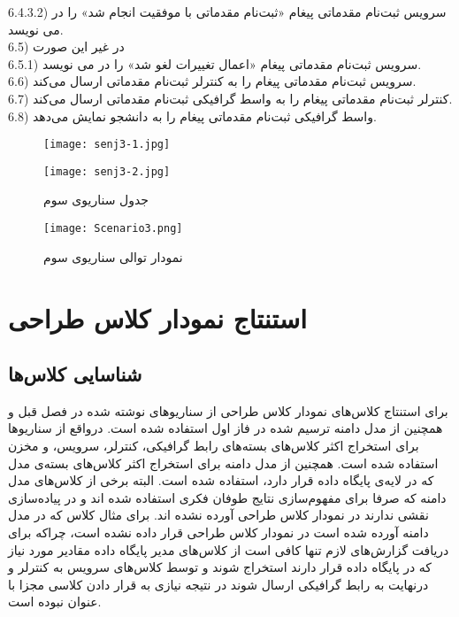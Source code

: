 \documentclass{report}
\begin{document}
6.4.3.2) سرویس ثبت‌نام مقدماتی پیغام «ثبت‌نام مقدماتی با موفقیت انجام شد» را در 
 می نویسد.\\
6.5) در غیر این صورت\\
6.5.1) سرویس ثبت‌نام مقدماتی پیغام «اعمال تغییرات لغو شد» را  در 
 می نویسد.\\
6.6) سرویس ثبت‌نام مقدماتی پیغام 
 را به کنترلر ثبت‌نام مقدماتی ارسال می‌کند.\\
6.7) کنترلر ثبت‌نام مقدماتی پیغام 
 را به واسط گرافیکی ثبت‌نام مقدماتی ارسال می‌کند.\\
6.8) واسط گرافیکی ثبت‌نام مقدماتی پیغام 
 را به دانشجو نمایش می‌دهد.\\
\clearpage
\begin{figure}[!h]
\texttt{[image: senj3-1.jpg]}
\end{figure} 
\begin{figure}[!h]
\texttt{[image: senj3-2.jpg]}
\caption{جدول سناریوی سوم} 
\end{figure}
\clearpage
{}
\begin{figure}[!h]
\centering
\texttt{[image: Scenario3.png]}
\caption{نمودار توالی سناریوی سوم}
\end{figure}
\clearpage

\chapter{استنتاج نمودار کلاس طراحی}

\section{شناسایی کلاس‌ها}
برای استنتاج کلاس‌های نمودار کلاس طراحی از سناریوهای نوشته شده در فصل قبل و همچنین از مدل دامنه ترسیم شده در فاز اول استفاده شده است. درواقع از سناریوها برای استخراج اکثر کلاس‌های بسته‌های رابط گرافیکی، کنترلر، سرویس، و مخزن استفاده شده است. همچنین از مدل دامنه برای استخراج اکثر کلاس‌های بسته‌ی مدل که در لایه‌ی پایگاه داده قرار دارد، استفاده شده است. البته برخی از کلاس‌های مدل دامنه که صرفا برای مفهوم‌سازی نتایج طوفان فکری استفاده شده اند و در پیاده‌سازی نقشی ندارند در نمودار کلاس طراحی آورده نشده اند. برای مثال کلاس
که در مدل دامنه آورده شده است در نمودار کلاس طراحی قرار داده نشده است، چراکه برای دریافت گزارش‌های لازم تنها کافی است از کلاس‌های مدیر پایگاه داده مقادیر مورد نیاز که در پایگاه داده قرار دارند استخراج شوند و توسط کلاس‌های سرویس به کنترلر و درنهایت به رابط گرافیکی ارسال شوند در نتیجه نیازی به قرار دادن کلاسی مجزا با عنوان
نبوده است.
\end{document}
